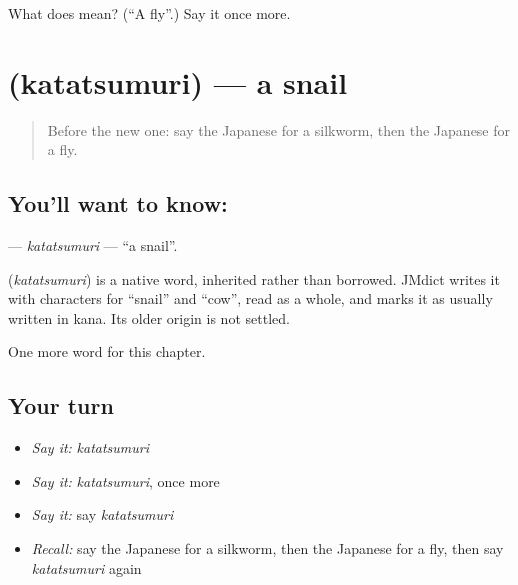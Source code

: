 \begin{tcolorbox}[breakable,colback=teal!4,colframe=teal!35!black,title={Before you move on}]
What does  mean? (\textquotedblleft{}A fly\textquotedblright{}.) Say it once more.
\end{tcolorbox}
\section[\texorpdfstring{\ja{かたつむり} (katatsumuri)}{かたつむり (katatsumuri)}]{ (katatsumuri) — a snail}

\label{lesson:JA-C110-katatsumuri}



\begin{quote}
Before the new one: say the Japanese for a silkworm, then the Japanese for a fly.
\end{quote}

\subsection*{You'll want to know: }
\textbf{} — \emph{katatsumuri} — \textquotedblleft{}a snail\textquotedblright{}.

\begin{cousinweb}
\textbf{} (\emph{katatsumuri}) is a native word, inherited rather than borrowed. JMdict writes it with characters for \textquotedblleft{}snail\textquotedblright{} and \textquotedblleft{}cow\textquotedblright{}, read as a whole, and marks it as usually written in kana. Its older origin is not settled.
\end{cousinweb}

\begin{grammarlens}[title={What you've built}]
One more word for this chapter.
\end{grammarlens}

\subsection*{Your turn}
\begin{itemize}
\raggedright
  \item \emph{Say it:} \emph{katatsumuri}
  \item \emph{Say it:} \emph{katatsumuri}, once more
  \item \emph{Say it:} say \emph{katatsumuri}
  \item \emph{Recall:} say the Japanese for a silkworm, then the Japanese for a fly, then say \emph{katatsumuri} again
\end{itemize}

